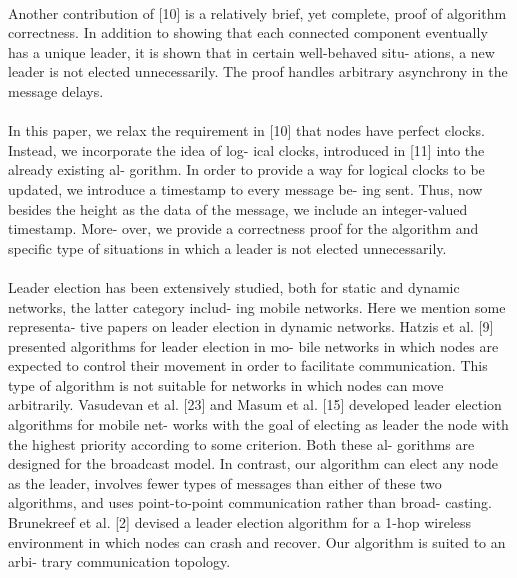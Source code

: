 \documentclass{article}
\begin{document}
\paragraph{}Another contribution of [10] is a relatively brief, yet
complete, proof of algorithm correctness. In addition to
showing that each connected component eventually has a
unique leader, it is shown that in certain well-behaved situ-
ations, a new leader is not elected unnecessarily. The proof
handles arbitrary asynchrony in the message delays.

\paragraph{}In this paper, we relax the requirement in [10] that nodes
have perfect clocks. Instead, we incorporate the idea of log-
ical clocks, introduced in [11] into the already existing al-
gorithm. In order to provide a way for logical clocks to be
updated, we introduce a timestamp to every message be-
ing sent. Thus, now besides the height as the data of the
message, we include an integer-valued timestamp. More-
over, we provide a correctness proof for the algorithm and
specific type of situations in which a leader is not elected
unnecessarily.

\newpage

\paragraph{}Leader election has been extensively studied, both for
static and dynamic networks, the latter category includ-
ing mobile networks. Here we mention some representa-
tive papers on leader election in dynamic networks. Hatzis
et al. [9] presented algorithms for leader election in mo-
bile networks in which nodes are expected to control their
movement in order to facilitate communication. This type
of algorithm is not suitable for networks in which nodes
can move arbitrarily. Vasudevan et al. [23] and Masum et
al. [15] developed leader election algorithms for mobile net-
works with the goal of electing as leader the node with the
highest priority according to some criterion. Both these al-
gorithms are designed for the broadcast model. In contrast,
our algorithm can elect any node as the leader, involves
fewer types of messages than either of these two algorithms,
and uses point-to-point communication rather than broad-
casting. Brunekreef et al. [2] devised a leader election
algorithm for a 1-hop wireless environment in which nodes
can crash and recover. Our algorithm is suited to an arbi-
trary communication topology.
\end{document}
